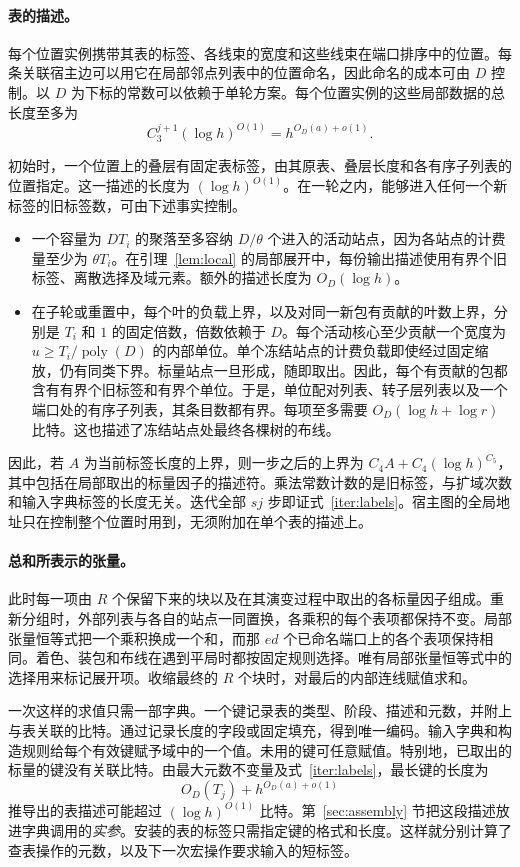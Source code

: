 \paragraph{表的描述。} 每个位置实例携带其表的标签、各线束的宽度和这些线束在端口排序中的位置。每条关联宿主边可以用它在局部邻点列表中的位置命名，因此命名的成本可由 $D$ 控制。以 $D$ 为下标的常数可以依赖于单轮方案。每个位置实例的这些局部数据的总长度至多为 \begin{equation}
 C_3^{j+1}(\log h)^{O(1)}
   =h^{O_D(a)+o(1)} .
 \label{iter:labels}
\end{equation}

初始时，一个位置上的叠层有固定表标签，由其原表、叠层长度和各有序子列表的位置指定。这一描述的长度为 $(\log h)^{O(1)}$。在一轮之内，能够进入任何一个新标签的旧标签数，可由下述事实控制。\begin{itemize} \item 一个容量为 $DT_i$ 的聚落至多容纳 $D/\theta$ 个进入的活动站点，因为各站点的计费量至少为 $\theta T_i$。在引理~\ref{lem:local} 的局部展开中，每份输出描述使用有界个旧标签、离散选择及域元素。额外的描述长度为 $O_D(\log h)$。\item 在子轮或重置中，每个叶的负载上界，以及对同一新包有贡献的叶数上界，分别是 $T_i$ 和 $1$ 的固定倍数，倍数依赖于 $D$。每个活动核心至少贡献一个宽度为 $u\ge T_i/\operatorname{poly}(D)$ 的内部单位。单个冻结站点的计费负载即使经过固定缩放，仍有同类下界。标量站点一旦形成，随即取出。因此，每个有贡献的包都含有有界个旧标签和有界个单位。于是，单位配对列表、转子层列表以及一个端口处的有序子列表，其条目数都有界。每项至多需要 $O_D(\log h+\log r)$ 比特。这也描述了冻结站点处最终各棵树的布线。\end{itemize} 因此，若 $A$ 为当前标签长度的上界，则一步之后的上界为 $C_4A+C_4(\log h)^{C_5}$，其中包括在局部取出的标量因子的描述符。乘法常数计数的是旧标签，与扩域次数和输入字典标签的长度无关。迭代全部 $sj$ 步即证式~\eqref{iter:labels}。宿主图的全局地址只在控制整个位置时用到，无须附加在单个表的描述上。

\paragraph{总和所表示的张量。} 此时每一项由 $R$ 个保留下来的块以及在其演变过程中取出的各标量因子组成。重新分组时，外部列表与各自的站点一同置换，各乘积的每个表项都保持不变。局部张量恒等式把一个乘积换成一个和，而那 $ed$ 个已命名端口上的各个表项保持相同。着色、装包和布线在遇到平局时都按固定规则选择。唯有局部张量恒等式中的选择用来标记展开项。收缩最终的 $R$ 个块时，对最后的内部连线赋值求和。

一次这样的求值只需一部字典。一个键记录表的类型、阶段、描述和元数，并附上与表关联的比特。通过记录长度的字段或固定填充，得到唯一编码。输入字典和构造规则给每个有效键赋予域中的一个值。未用的键可任意赋值。特别地，已取出的标量的键没有关联比特。由最大元数不变量及式~\eqref{iter:labels}，最长键的长度为 \[
 O_D(T_j)+h^{O_D(a)+o(1)}
\] 推导出的表描述可能超过 $(\log h)^{O(1)}$ 比特。第~\ref{sec:assembly} 节把这段描述放进字典调用的\emph{实参}。安装的表的标签只需指定键的格式和长度。这样就分别计算了查表操作的元数，以及下一次宏操作要求输入的短标签。
